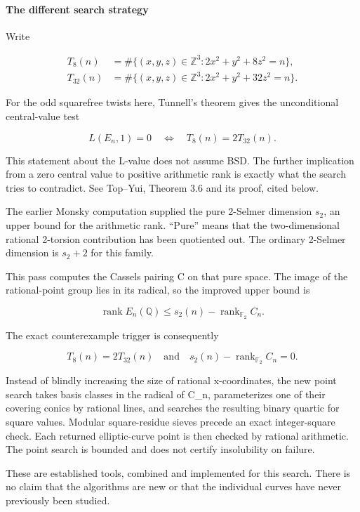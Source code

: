 \documentclass[11pt]{article}
\begin{document}
\paragraph{The different search strategy}

Write

\begin{align*}
T_8(n)&=\#\{(x,y,z)\in\mathbb Z^3:2x^2+y^2+8z^2=n\},\\
T_{32}(n)&=\#\{(x,y,z)\in\mathbb Z^3:2x^2+y^2+32z^2=n\}.
\end{align*}

For the odd squarefree twists here, Tunnell's theorem gives the unconditional central-value test

\[L(E_n,1)=0\quad\Longleftrightarrow\quad T_8(n)=2T_{32}(n).\]

This statement about the L-value does not assume BSD. The further implication from a zero central value to positive arithmetic rank is exactly what the search tries to contradict. See Top--Yui, Theorem 3.6 and its proof, cited below.

The earlier Monsky computation supplied the pure 2-Selmer dimension \(s_2\), an upper bound for the arithmetic rank. ``Pure'' means that the two-dimensional rational 2-torsion contribution has been quotiented out. The ordinary 2-Selmer dimension is \(s_2+2\) for this family.

This pass computes the Cassels pairing C on that pure space. The image of the rational-point group lies in its radical, so the improved upper bound is

\[\operatorname{rank}E_n(\mathbb Q)\le s_2(n)-\operatorname{rank}_{\mathbb F_2}C_n.\]

The exact counterexample trigger is consequently

\[T_8(n)=2T_{32}(n)\quad\text{and}\quad s_2(n)-\operatorname{rank}_{\mathbb F_2}C_n=0.\]

Instead of blindly increasing the size of rational x-coordinates, the new point search takes basis classes in the radical of C\_n, parameterizes one of their covering conics by rational lines, and searches the resulting binary quartic for square values. Modular square-residue sieves precede an exact integer-square check. Each returned elliptic-curve point is then checked by rational arithmetic. The point search is bounded and does not certify insolubility on failure.

These are established tools, combined and implemented for this search. There is no claim that the algorithms are new or that the individual curves have never previously been studied.
\end{document}
